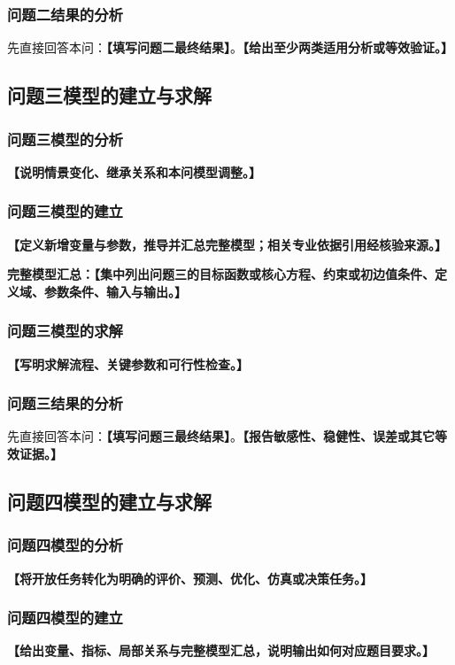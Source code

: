 \documentclass[UTF8,a4paper,12pt,zihao=-4]{ctexart}
\newcommand{\TemplateField}[1]{\textbf{【#1】}}
\begin{document}
\subsubsection{问题二结果的分析}
先直接回答本问：\textbf{【填写问题二最终结果】}。\TemplateField{给出至少两类适用分析或等效验证。}

\subsection{问题三模型的建立与求解}

\subsubsection{问题三模型的分析}
\TemplateField{说明情景变化、继承关系和本问模型调整。}

\subsubsection{问题三模型的建立}
\TemplateField{定义新增变量与参数，推导并汇总完整模型；相关专业依据引用经核验来源\cite{topic-ref-4}。}

\noindent\textbf{完整模型汇总：}\TemplateField{集中列出问题三的目标函数或核心方程、约束或初边值条件、定义域、参数条件、输入与输出。}

\subsubsection{问题三模型的求解}
\TemplateField{写明求解流程、关键参数和可行性检查。}

\subsubsection{问题三结果的分析}
先直接回答本问：\textbf{【填写问题三最终结果】}。\TemplateField{报告敏感性、稳健性、误差或其它等效证据。}

\subsection{问题四模型的建立与求解}

\subsubsection{问题四模型的分析}
\TemplateField{将开放任务转化为明确的评价、预测、优化、仿真或决策任务。}

\subsubsection{问题四模型的建立}
\TemplateField{给出变量、指标、局部关系与完整模型汇总，说明输出如何对应题目要求。}
\end{document}
